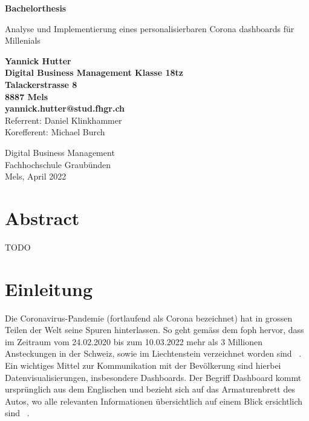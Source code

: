 \documentclass[12pt, oneside]{article}
\begin{document}
\begin{titlepage}
	\begin{center}
		\Huge
		\textbf{Bachelorthesis}
		
		\vspace{0.5cm}
		\LARGE
		Analyse und Implementierung eines personalisierbaren Corona dashboards für Millenials
		
		\vspace{1.5cm}
		\normalsize
		\textbf{Yannick Hutter}\\
		\textbf{Digital Business Management Klasse 18tz}\\
		\textbf{Talackerstrasse 8}\\
		\textbf{8887 Mels}\\
		\textbf{yannick.hutter@stud.fhgr.ch}\\

		
		\vfill
		Referrent: Daniel Klinkhammer\\
		Korefferent: Michael Burch\\
		
		\vspace{0.8cm}
		
		
		Digital Business Management\\
		Fachhochschule Graubünden\\
		Mels, April 2022
	\end{center}
\end{titlepage}

\clearpage
\section*{Abstract}
TODO


\clearpage
\tableofcontents
\listoffigures
\listoftables

\clearpage
\printglossaries


\clearpage
\section{Einleitung}
Die Coronavirus-Pandemie (fortlaufend als Corona bezeichnet) hat in grossen Teilen der Welt seine Spuren hinterlassen. So geht gemäss dem \Gls{foph} hervor, dass im Zeitraum vom 24.02.2020 bis zum 10.03.2022 mehr als 3 Millionen Ansteckungen in der Schweiz, sowie im Liechtenstein verzeichnet worden sind ~\citep{FOPH.13.03.2022}. Ein wichtiges Mittel zur Kommunikation mit der Bevölkerung sind hierbei Datenvisualisierungen, insbesondere Dashboards.
Der Begriff Dashboard kommt ursprünglich aus dem Englischen und bezieht sich auf das Armaturenbrett des Autos, wo alle relevanten Informationen übersichtlich auf einem Blick ersichtlich sind ~\citep{Duden.18.04.2022}.\\
\end{document}
